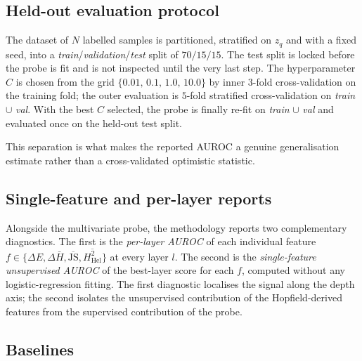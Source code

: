\subsection{Held-out evaluation protocol}
\label{subsec:eval_protocol}

The dataset of $N$ labelled samples is partitioned, stratified on $z_q$
and with a fixed seed, into a \emph{train}/\emph{validation}/\emph{test}
split of $70/15/15$. The test split is locked before the probe is
fit and is not inspected until the very last step. The hyperparameter
$C$ is chosen from the grid $\{0.01,\,0.1,\,1.0,\,10.0\}$ by inner
$3$-fold cross-validation on the training fold; the outer evaluation is
$5$-fold stratified cross-validation on \emph{train} $\cup$ \emph{val}.
With the best $C$ selected, the probe is finally re-fit on
\emph{train} $\cup$ \emph{val} and evaluated once on the held-out test
split.

This separation is what makes the reported AUROC a genuine generalisation
estimate rather than a cross-validated optimistic statistic.

\subsection{Single-feature and per-layer reports}
\label{subsec:single_feature_reports}

Alongside the multivariate probe, the methodology reports two
complementary diagnostics. The first is the \emph{per-layer AUROC} of
each individual feature $f \in \{\Delta E, \Delta \bar{H},
\overline{\mathrm{JS}}, \overline{H^2_{\mathrm{Hel}}}\}$ at every layer
$l$. The second is the \emph{single-feature unsupervised AUROC} of the
best-layer score for each $f$, computed without any logistic-regression
fitting. The first diagnostic localises the signal along the depth axis;
the second isolates the unsupervised contribution of the Hopfield-derived
features from the supervised contribution of the probe.

\subsection{Baselines}
\label{subsec:baselines}

